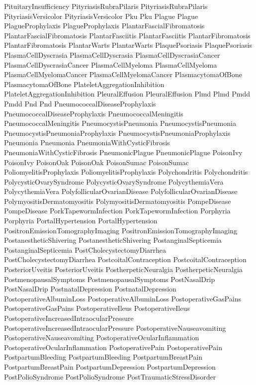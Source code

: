  PituitaryInsufficiency
 PityriasisRubraPilaris
 PityriasisRubraPilaris
 PityriasisVersicolor
 PityriasisVersicolor
 Pku
 Pku
 Plague
 Plague
 PlagueProphylaxis
 PlagueProphylaxis
 PlantarFascialFibromatosis
 PlantarFascialFibromatosis
 PlantarFasciitis
 PlantarFasciitis
 PlantarFibromatosis
 PlantarFibromatosis
 PlantarWarts
 PlantarWarts
 PlaquePsoriasis
 PlaquePsoriasis
 PlasmaCellDyscrasia
 PlasmaCellDyscrasia
 PlasmaCellDyscrasiaCancer
 PlasmaCellDyscrasiaCancer
 PlasmaCellMyeloma
 PlasmaCellMyeloma
 PlasmaCellMyelomaCancer
 PlasmaCellMyelomaCancer
 PlasmacytomaOfBone
 PlasmacytomaOfBone
 PlateletAggregationInhibition
 PlateletAggregationInhibition
 PleuralEffusion
 PleuralEffusion
 Plmd
 Plmd
 Pmdd
 Pmdd
 Pnd
 Pnd
 PneumococcalDiseaseProphylaxis
 PneumococcalDiseaseProphylaxis
 PneumococcalMeningitis
 PneumococcalMeningitis
 PneumocystisPneumonia
 PneumocystisPneumonia
 PneumocystisPneumoniaProphylaxis
 PneumocystisPneumoniaProphylaxis
 Pneumonia
 Pneumonia
 PneumoniaWithCysticFibrosis
 PneumoniaWithCysticFibrosis
 PneumonicPlague
 PneumonicPlague
 PoisonIvy
 PoisonIvy
 PoisonOak
 PoisonOak
 PoisonSumac
 PoisonSumac
 PoliomyelitisProphylaxis
 PoliomyelitisProphylaxis
 Polychondritis
 Polychondritis
 PolycysticOvarySyndrome
 PolycysticOvarySyndrome
 PolycythemiaVera
 PolycythemiaVera
 PolyfollicularOvarianDisease
 PolyfollicularOvarianDisease
 PolymyositisDermatomyositis
 PolymyositisDermatomyositis
 PompeDisease
 PompeDisease
 PorkTapewormInfection
 PorkTapewormInfection
 Porphyria
 Porphyria
 PortalHypertension
 PortalHypertension
 PositronEmissionTomographyImaging
 PositronEmissionTomographyImaging
 PostanestheticShivering
 PostanestheticShivering
 PostanginalSepticemia
 PostanginalSepticemia
 PostCholecystectomyDiarrhea
 PostCholecystectomyDiarrhea
 PostcoitalContraception
 PostcoitalContraception
 PosteriorUveitis
 PosteriorUveitis
 PostherpeticNeuralgia
 PostherpeticNeuralgia
 PostmenopausalSymptoms
 PostmenopausalSymptoms
 PostNasalDrip
 PostNasalDrip
 PostnatalDepression
 PostnatalDepression
 PostoperativeAlbuminLoss
 PostoperativeAlbuminLoss
 PostoperativeGasPains
 PostoperativeGasPains
 PostoperativeIleus
 PostoperativeIleus
 PostoperativeIncreasedIntraocularPressure
 PostoperativeIncreasedIntraocularPressure
 PostoperativeNauseavomiting
 PostoperativeNauseavomiting
 PostoperativeOcularInflammation
 PostoperativeOcularInflammation
 PostoperativePain
 PostoperativePain
 PostpartumBleeding
 PostpartumBleeding
 PostpartumBreastPain
 PostpartumBreastPain
 PostpartumDepression
 PostpartumDepression
 PostPolioSyndrome
 PostPolioSyndrome
 PostTraumaticStressDisorder
